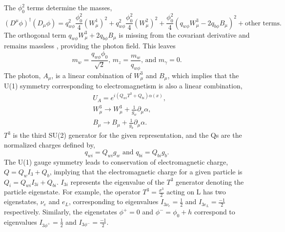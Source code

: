 The $\phi_0^2$ terms determine the masses,
\begin{equation}
(D^\mu\phi)^\dagger(D_\mu\phi) = q^2_{w\phi}\frac{\phi_0^2}{4}(W^1_\mu)^2 + q^2_{w\phi}\frac{\phi_0^2}{4}(W^2_\mu)^2 
                                      + \frac{\phi_0^2}{4}(q_{w\phi}W^3_\mu - 2q_{b\phi}B_\mu)^2 + \text{other terms.}
\end{equation}
The orthogonal term $q_{w\phi}W^3_\mu + 2q_{b\phi}B_\mu$ is missing from the covariant derivative and remains massless \cite{qftam}, providing the photon field. This leaves 
\begin{equation}
m_{w} = \frac{q_{w\phi}\phi_0}{\sqrt{2}} \text{, }
m_z = \frac{m_w}{q_{w\phi}} \text{, and } m_\gamma = 0.
\end{equation}
The photon, $A_\mu$, is a linear combination of $W^3_\mu$ and $B_\mu$, which implies that the U(1) symmetry corresponding to electromagnetism is also a linear combination, 
\begin{equation}
\begin{split}
& U_A = e^{i(Q_{wi}T^3 + Q_{bi})\alpha(x)}, \\
& W^3_\mu \rightarrow W^3_\mu + \frac{1}{g_w}\partial_\mu\alpha, \\
& B_\mu \rightarrow B_\mu + \frac{1}{g_b}\partial_\mu\alpha.
\end{split}
\end{equation}
$T^3$ is the third SU(2) generator for the given representation, and the Qs are the normalized charges defined by,
\begin{equation}
q_{wi} = Q_{wi}g_w \text{ and } q_{bi} = Q_{bi}g_b.
\end{equation} 
The U(1) gauge symmetry leads to conservation of electromagnetic charge, $Q = Q_{w}I_{3} + Q_{b}$, implying that the electromagnetic charge for a given particle is $Q_i = Q_{wi}I_{3i} + Q_{bi}$. $I_{3i}$ represents the eigenvalue of the $T^3$ generator denoting the particle eigenstate. For example, the operator $T^3 = \frac{\sigma^3}{2}$ acting on L has two eigenstates, $\nu_e$ and $e_L$, corresponding to eigenvalues $I_{3\nu_e} = \frac{1}{2}$ and $I_{3e_L} = \frac{-1}{2}$ respectively. Similarly, the eigenstates $\phi^+ = 0$ and $\phi^- = \phi_0 + h$ correspond to eigenvalues $I_{3\phi^+} = \frac{1}{2}$ and $I_{3\phi^-} = \frac{-1}{2}$.  

